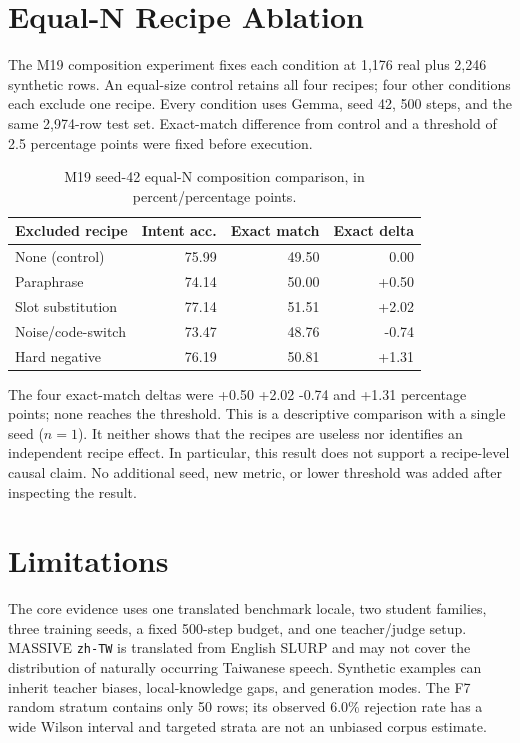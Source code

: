 \documentclass[11pt]{article}
\begin{document}
\section{Equal-N Recipe Ablation}
The M19 composition experiment fixes each condition at 1,176 real plus 2,246
synthetic rows.  An equal-size control retains all four recipes; four other
conditions each exclude one recipe.  Every condition uses Gemma, seed 42, 500
steps, and the same 2,974-row test set.  Exact-match difference from control and
a threshold of 2.5 percentage points were fixed before execution.

\begin{table}[ht]
\centering
\small
\begin{tabular}{lrrr}
\toprule
Excluded recipe & Intent acc. & Exact match & Exact delta \\
\midrule
None (control) & 75.99 & 49.50 & 0.00 \\
Paraphrase & 74.14 & 50.00 & +0.50 \\
Slot substitution & 77.14 & 51.51 & +2.02 \\
Noise/code-switch & 73.47 & 48.76 & -0.74 \\
Hard negative & 76.19 & 50.81 & +1.31 \\
\bottomrule
\end{tabular}
\caption{M19 seed-42 equal-N composition comparison, in percent/percentage points.}
\label{tab:m19}
\end{table}

The four exact-match deltas were +0.50 +2.02 -0.74 and +1.31 percentage points;
none reaches the threshold.  This is a descriptive comparison with a single seed
(\(n=1\)).  It neither shows that the recipes are useless nor identifies an
independent recipe effect.  In particular, this result does not support a recipe-level causal claim.
No additional seed, new metric, or lower threshold
was added after inspecting the result.

\section{Limitations}
The core evidence uses one translated benchmark locale, two student families,
three training seeds, a fixed 500-step budget, and one teacher/judge setup.
MASSIVE \texttt{zh-TW} is translated from English SLURP and may not cover the
distribution of naturally occurring Taiwanese speech.  Synthetic examples can
inherit teacher biases, local-knowledge gaps, and generation modes.  The F7
random stratum contains only 50 rows; its observed 6.0\% rejection rate has a
wide Wilson interval and targeted strata are not an unbiased corpus estimate.
\end{document}
